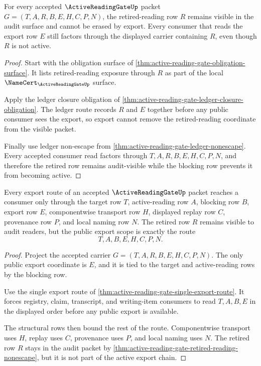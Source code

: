 \begin{theorem}
\label{thm:active-reading-gate-retired-reading-nonescape}
For every accepted $\ActiveReadingGateUp$ packet $G=(T,A,R,B,E,H,C,P,N)$, the retired-reading row $R$ remains visible in the audit surface and cannot be erased by export. Every consumer that reads the export row $E$ still factors through the displayed carrier containing $R$, even though $R$ is not active.
\end{theorem}
\begin{proof}
Start with the obligation surface of \autoref{thm:active-reading-gate-obligation-surface}. It lists retired-reading exposure through $R$ as part of the local $\NameCert_{\ActiveReadingGateUp}$ surface.

Apply the ledger closure obligation of \autoref{thm:active-reading-gate-ledger-closure-obligation}. The ledger route records $R$ and $E$ together before any public consumer sees the export, so export cannot remove the retired-reading coordinate from the visible packet.

Finally use ledger non-escape from \autoref{thm:active-reading-gate-ledger-nonescape}. Every accepted consumer read factors through $T,A,R,B,E,H,C,P,N$, and therefore the retired row remains audit-visible while the blocking row prevents it from becoming active.
\end{proof}

\begin{theorem}
\label{thm:active-reading-gate-export-scope}
Every export route of an accepted $\ActiveReadingGateUp$ packet reaches a consumer only through the target row $T$, active-reading row $A$, blocking row $B$, export row $E$, componentwise transport row $H$, displayed replay row $C$, provenance row $P$, and local naming row $N$. The retired row $R$ remains visible to audit readers, but the public export scope is exactly the route
$$
T,A,B,E,H,C,P,N.
$$
\end{theorem}
\begin{proof}
Project the accepted carrier $G=(T,A,R,B,E,H,C,P,N)$. The only public export coordinate is $E$, and it is tied to the target and active-reading rows by the blocking row.

Use the single export route of \autoref{thm:active-reading-gate-single-export-route}. It forces registry, claim, transcript, and writing-item consumers to read $T,A,B,E$ in the displayed order before any public export is available.

The structural rows then bound the rest of the route. Componentwise transport uses $H$, replay uses $C$, provenance uses $P$, and local naming uses $N$. The retired row $R$ stays in the audit packet by \autoref{thm:active-reading-gate-retired-reading-nonescape}, but it is not part of the active export chain.
\end{proof}

